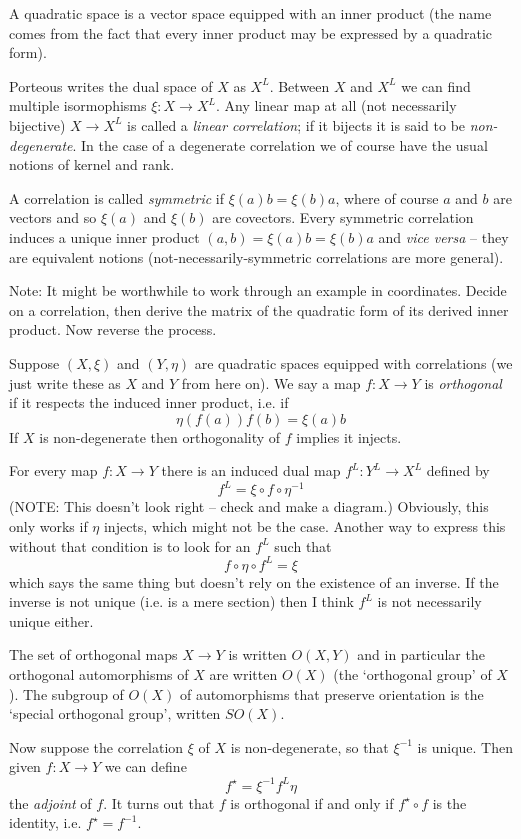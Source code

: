 \documentclass[oneside,english]{amsbook}
\numberwithin{section}{chapter}
\theoremstyle{plain}
\theoremstyle{definition}
\begin{document}
A quadratic space is a vector space equipped with an inner product (the name comes from the fact that every inner product may be expressed by a quadratic form).

Porteous writes the dual space of $X$ as $X^L$. Between $X$ and $X^L$ we can find multiple isormophisms $\xi:X\to X^L$. Any linear map at all (not necessarily bijective) $X\to X^L$ is called a \emph{linear correlation}; if it bijects it is said to be \emph{non-degenerate}. In the case of a degenerate correlation we of course have the usual notions of kernel and rank.

A correlation is called \emph{symmetric} if $\xi(a)b = \xi(b)a$, where of course $a$ and $b$ are vectors and so $\xi(a)$ and $\xi(b)$ are covectors. Every symmetric correlation induces a unique inner product $(a, b) = \xi(a)b = \xi(b)a$ and \emph{vice versa} -- they are equivalent notions (not-necessarily-symmetric correlations are more general). 

Note: It might be worthwhile to work through an example in coordinates. Decide on a correlation, then derive the matrix of the quadratic form of its derived inner product. Now reverse the process.

Suppose $(X, \xi)$ and $(Y, \eta)$ are quadratic spaces equipped with correlations (we just write these as $X$ and $Y$ from here on). We say a map $f:X\to Y$ is \emph{orthogonal} if it respects the induced inner product, i.e. if
\[
	\eta(f(a))f(b) = \xi(a)b
\]
If $X$ is non-degenerate then orthogonality of $f$ implies it injects.

For every map $f:X\to Y$ there is an induced dual map $f^L:Y^L\to X^L$ defined by
\[
	f^L = \xi\circ f \circ\eta^{-1}
\]
(NOTE: This doesn't look right -- check and make a diagram.)
Obviously, this only works if $\eta$ injects, which might not be the case. Another way to express this without that condition is to look for an $f^L$ such that 
\[
	f\circ\eta\circ f^L = \xi
\]
which says the same thing but doesn't rely on the existence of an inverse. If the inverse is not unique (i.e. is a mere section) then I think $f^L$ is not necessarily unique either.

The set of orthogonal maps $X\to Y$ is written $O(X, Y)$ and in particular the orthogonal automorphisms of $X$ are written $O(X)$ (the `orthogonal group' of $X$). The subgroup of $O(X)$ of automorphisms that preserve orientation is the `special orthogonal group', written $SO(X)$. 

Now suppose the correlation $\xi$ of $X$ is non-degenerate, so that $\xi^{-1}$ is unique. Then given $f:X\to Y$ we can define
\[
	f^\star = \xi^{-1}f^L\eta
\]
the \emph{adjoint} of $f$. It turns out that $f$ is orthogonal if and only if $f^\star\circ f$ is the identity, i.e. $f^\star = f^{-1}$.
\end{document}

